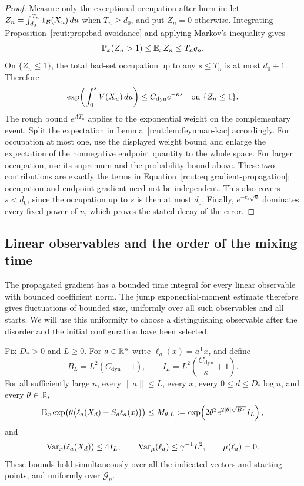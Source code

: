 \begin{proof}
Measure only the exceptional occupation after burn-in: let
$Z_n=\int_{d_0}^{T_n}\mathbf 1_{\mathcal B}(X_u)\,du$ when
$T_n\ge d_0$, and put $Z_n=0$ otherwise.  Integrating
Proposition~\ref{rcut:prop:bad-avoidance} and applying Markov's
inequality gives
\[
 \mathbb P_x(Z_n>1)\le\mathbb E_x Z_n\le T_nq_n.
\]
On $\{Z_n\le1\}$, the total bad-set occupation up to any
$s\le T_n$ is at most $d_0+1$.  Therefore
\[
 \exp\!\left(\int_0^s V(X_u)\,du\right)
 \le C_{\mathrm{dyn}}e^{-\kappa s}
 \quad\hbox{on }\{Z_n\le1\}.
\]
The rough bound $e^{AT_n}$ applies to the exponential weight on the
complementary event.  Split the expectation in
Lemma~\ref{rcut:lem:feynman-kac} accordingly.  For occupation at most one, use the displayed weight bound and enlarge
the expectation of the nonnegative endpoint quantity to the whole
space.  For larger occupation, use its supremum and the probability
bound above.  These two contributions are exactly the terms in
Equation~\eqref{rcut:eq:gradient-propagation}; occupation and endpoint
gradient need not be independent.  This also covers $s<d_0$, since the
occupation up to $s$ is then at most $d_0$.  Finally,
$e^{-c_{\mathrm a}\sqrt n}$ dominates every fixed power of $n$, which
proves the stated decay of the error.
\end{proof}

\subsection{Linear observables and the order of the mixing time}

The propagated gradient has a bounded time integral for every linear
observable with bounded coefficient norm.  The jump exponential-moment
estimate therefore gives fluctuations of bounded size, uniformly over
all such observables and all starts.  We will use this uniformity to
choose a distinguishing observable after the disorder and the initial
configuration have been selected.

\begin{proposition}
\label{rcut:prop:linear-concentration}
Fix $D_*>0$ and $L\ge0$.  For $a\in\mathbb R^n$ write
$\ell_a(x)=a^{\mathsf T}x$, and define
\[
 B_L=L^2(C_{\mathrm{dyn}}+1),\qquad
 I_L=L^2\left(\frac{C_{\mathrm{dyn}}}{\kappa}+1\right).
\]
For all sufficiently large $n$, every $\|a\|\le L$, every $x$,
every $0\le d\le D_*\log n$, and every $\theta\in\mathbb R$,
\begin{equation}
 \mathbb E_x\exp\!\left(\theta\bigl(\ell_a(X_d)-S_d\ell_a(x)\bigr)\right)
 \le M_{\theta,L}
 :=\exp\!\left(2\theta^2e^{2|\theta|\sqrt{B_L}}I_L\right),
 \label{rcut:eq:dyn-linear-mgf}
\end{equation}
and
\begin{equation}
 \operatorname{Var}_x(\ell_a(X_d))\le4I_L,\qquad
 \operatorname{Var}_\mu(\ell_a)\le\gamma^{-1}L^2,\qquad
 \mu(\ell_a)=0.
 \label{rcut:eq:dyn-linear-variance}
\end{equation}
These bounds hold simultaneously over all the indicated vectors and
starting points, and uniformly over $\mathcal G_n$.
\end{proposition}

